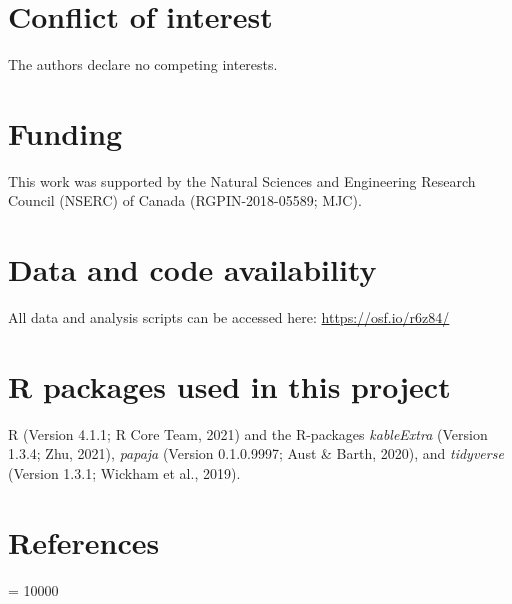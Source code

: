 \documentclass[
  english,
  man,floatsintext]{apa7}
\begin{document}
\hypertarget{conflict-of-interest}{%
\section{Conflict of interest}\label{conflict-of-interest}}

The authors declare no competing interests.

\hypertarget{funding}{%
\section{Funding}\label{funding}}

This work was supported by the Natural Sciences and Engineering Research Council (NSERC) of Canada (RGPIN-2018-05589; MJC).

\hypertarget{data-and-code-availability}{%
\section{Data and code availability}\label{data-and-code-availability}}

All data and analysis scripts can be accessed here: \url{https://osf.io/r6z84/}

\hypertarget{r-packages-used-in-this-project}{%
\section{R packages used in this project}\label{r-packages-used-in-this-project}}

R (Version 4.1.1; R Core Team, 2021) and the R-packages \emph{kableExtra} (Version 1.3.4; Zhu, 2021), \emph{papaja} (Version 0.1.0.9997; Aust \& Barth, 2020), and \emph{tidyverse} (Version 1.3.1; Wickham et al., 2019).

\hypertarget{references}{%
\section{References}\label{references}}

\begingroup

\interlinepenalty = 10000 \setlength{\parindent}{-0.5in} \setlength{\leftskip}{0.5in}

\endgroup
\end{document}
